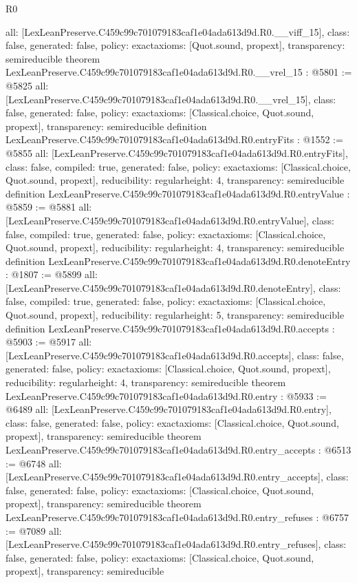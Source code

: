 \begin{lexlean}{R0}
\begin{coremodule}
{  all: [LexLeanPreserve.C459c99c701079183caf1e04ada613d9d.R0.__viff_15],
  class: false,
  generated: false,
  policy: exact{axioms: [Quot.sound, propext]},
  transparency: semireducible
}
theorem LexLeanPreserve.C459c99c701079183caf1e04ada613d9d.R0.__vrel_15 : @5801 := @5825 {
  all: [LexLeanPreserve.C459c99c701079183caf1e04ada613d9d.R0.__vrel_15],
  class: false,
  generated: false,
  policy: exact{axioms: [Classical.choice, Quot.sound, propext]},
  transparency: semireducible
}
definition LexLeanPreserve.C459c99c701079183caf1e04ada613d9d.R0.entryFits : @1552 := @5855 {
  all: [LexLeanPreserve.C459c99c701079183caf1e04ada613d9d.R0.entryFits],
  class: false,
  compiled: true,
  generated: false,
  policy: exact{axioms: [Classical.choice, Quot.sound, propext]},
  reducibility: regular{height: 4},
  transparency: semireducible
}
definition LexLeanPreserve.C459c99c701079183caf1e04ada613d9d.R0.entryValue : @5859 := @5881 {
  all: [LexLeanPreserve.C459c99c701079183caf1e04ada613d9d.R0.entryValue],
  class: false,
  compiled: true,
  generated: false,
  policy: exact{axioms: [Classical.choice, Quot.sound, propext]},
  reducibility: regular{height: 4},
  transparency: semireducible
}
definition LexLeanPreserve.C459c99c701079183caf1e04ada613d9d.R0.denoteEntry : @1807 := @5899 {
  all: [LexLeanPreserve.C459c99c701079183caf1e04ada613d9d.R0.denoteEntry],
  class: false,
  compiled: true,
  generated: false,
  policy: exact{axioms: [Classical.choice, Quot.sound, propext]},
  reducibility: regular{height: 5},
  transparency: semireducible
}
definition LexLeanPreserve.C459c99c701079183caf1e04ada613d9d.R0.accepts : @5903 := @5917 {
  all: [LexLeanPreserve.C459c99c701079183caf1e04ada613d9d.R0.accepts],
  class: false,
  generated: false,
  policy: exact{axioms: [Classical.choice, Quot.sound, propext]},
  reducibility: regular{height: 4},
  transparency: semireducible
}
theorem LexLeanPreserve.C459c99c701079183caf1e04ada613d9d.R0.entry : @5933 := @6489 {
  all: [LexLeanPreserve.C459c99c701079183caf1e04ada613d9d.R0.entry],
  class: false,
  generated: false,
  policy: exact{axioms: [Classical.choice, Quot.sound, propext]},
  transparency: semireducible
}
theorem LexLeanPreserve.C459c99c701079183caf1e04ada613d9d.R0.entry_accepts : @6513 := @6748 {
  all: [LexLeanPreserve.C459c99c701079183caf1e04ada613d9d.R0.entry_accepts],
  class: false,
  generated: false,
  policy: exact{axioms: [Classical.choice, Quot.sound, propext]},
  transparency: semireducible
}
theorem LexLeanPreserve.C459c99c701079183caf1e04ada613d9d.R0.entry_refuses : @6757 := @7089 {
  all: [LexLeanPreserve.C459c99c701079183caf1e04ada613d9d.R0.entry_refuses],
  class: false,
  generated: false,
  policy: exact{axioms: [Classical.choice, Quot.sound, propext]},
  transparency: semireducible
}


\end{coremodule}
\end{lexlean}
